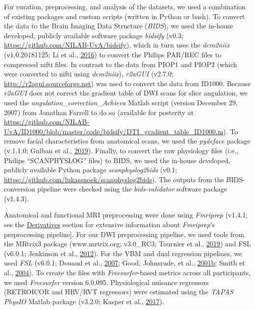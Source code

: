 \documentclass[11pt,american,a4paper,oneside,]{memoir} %
\begin{document}
For curation, preprocessing, and analysis of the datasets, we used a combination of existing packages and custom scripts (written in Python or bash). To convert the data to the Brain Imaging Data Structure (\emph{BIDS}), we used the in-house developed, publicly available software package \emph{bidsify} (v0.3; \url{https://github.com/NILAB-UvA/bidsify}), which in turn uses the \emph{dcm2niix} (v1.0.20181125; Li et al., \protect\hyperlink{ref-Li2016-ss}{2016}) to convert the Philips PAR/REC files to compressed nifti files. In contrast to the data from PIOP1 and PIOP2 (which were converted to nifti using \emph{dcm2niix}), \emph{r2aGUI} (v2.7.0; \url{http://r2agui.sourceforge.net}) was used to convert the data from ID1000. Because \emph{r2aGUI} does not correct the gradient table of DWI scans for slice angulation, we used the \emph{angulation\_correction\_Achieva} Matlab script (version December 29, 2007) from Jonathan Farrell to do so (available for posterity at \url{https://github.com/NILAB-UvA/ID1000/blob/master/code/bidsify/DTI_gradient_table_ID1000.m}). To remove facial characteristics from anatomical scans, we used the \emph{pydeface} package (v.1.1.0; Gulban et al., \protect\hyperlink{ref-Gulban2019-sv}{2019}). Finally, to convert the raw physiology files (i.e., Philips ``SCANPHYSLOG'' files) to BIDS, we used the in-house developed, publicly available Python package \emph{scanphyslog2bids} (v0.1; \url{https://github.com/lukassnoek/scanphyslog2bids}). The outputs from the BIDS-conversion pipeline were checked using the \emph{bids-validator} software package (v1.4.3).

Anatomical and functional MRI preprocessing were done using \emph{Fmriprep} (v1.4.1; see the \protect\hyperlink{aomic-derivatives}{Derivatives} section for extensive information about \emph{Fmriprep}'s preprocessing pipeline{]}. For our DWI preprocessing pipeline, we used tools from the MRtrix3 package (www.mrtrix.org; v3.0\_RC3; Tournier et al., \protect\hyperlink{ref-Tournier2019-hh}{2019}) and FSL (v6.0.1; Jenkinson et al., \protect\hyperlink{ref-Jenkinson2012-ui}{2012}). For the VBM and dual regression pipelines, we used \emph{FSL} (v6.0.1; Douaud et al., \protect\hyperlink{ref-Douaud2007-sw}{2007}; Good, Johnsrude, et al., \protect\hyperlink{ref-Good2001-kv}{2001}\protect\hyperlink{ref-Good2001-kv}{b}; Smith et al., \protect\hyperlink{ref-Smith2004-sc}{2004}). To create the files with \emph{Freesurfer}-based metrics across all participants, we used \emph{Freesurfer} version 6.0.095. Physiological nuisance regressors (RETROICOR and HRV/RVT regressors) were estimated using the \emph{TAPAS PhysIO} Matlab package (v3.2.0; Kasper et al., \protect\hyperlink{ref-Kasper2017-lp}{2017}).
\end{document}
